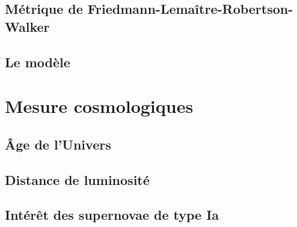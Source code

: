 \documentclass[../main/main.tex]{subfiles}
\begin{document}
\subsection{Métrique de Friedmann-Lemaître-Robertson-Walker}\label{ssec:FLRW}

\subsection{Le modèle \lcdm}\label{ssec:LCDM}

\section{Mesure cosmologiques}\label{sec:dist}

\subsection{Âge de l'Univers}\label{ssec:age}

\subsection{Distance de luminosité}\label{ssec:dl}

\subsection{Intérêt des supernovae de type Ia}\label{ssec:intsne}

\lipsum[2-4]
\end{document}
